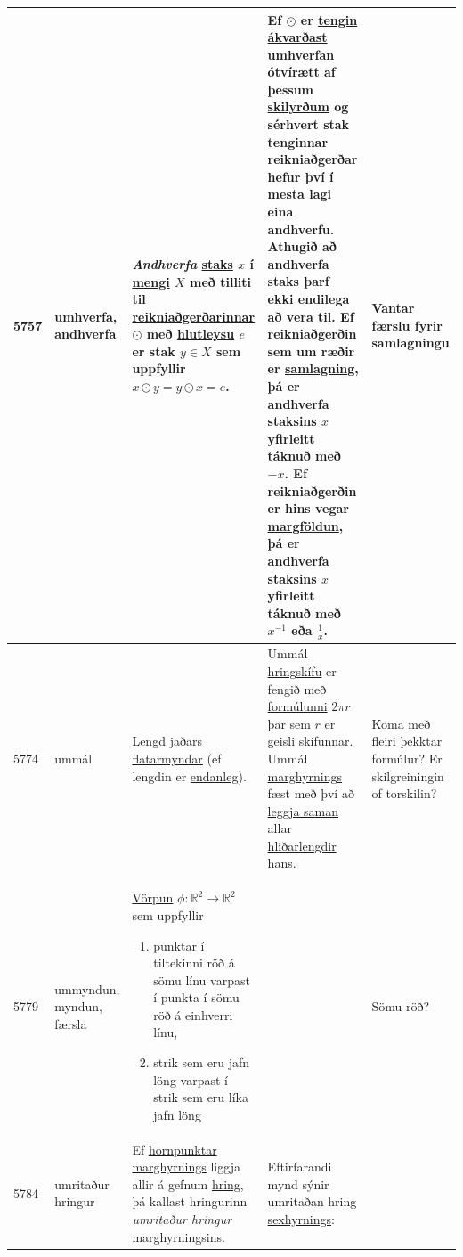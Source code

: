 \begin{longtable}{p{} | p{} | p{} | p{} | p{}}
\hline
5757 & \hypertarget{row:5757}{umhverfa, andhverfa} & \textit{Andhverfa} \hyperlink{row:5128}{staks} \(x\) í \hyperlink{row:3270}{mengi} \(X\) með tilliti til \hyperlink{row:46}{reikniaðgerðarinnar} \(\odot\) með \hyperlink{row:0}{hlutleysu} \(e\) er stak \(y \in X\) sem uppfyllir \(x \odot y = y \odot x = e\). & Ef \(\odot\) er \hyperlink{row:5473}{tengin} \hyperlink{row:3932}{ákvarðast umhverfan ótvírætt} af þessum \hyperlink{row:4797}{skilyrðum} og sérhvert stak tenginnar reikniaðgerðar hefur því í mesta lagi eina andhverfu. Athugið að andhverfa staks þarf ekki endilega að vera til. Ef reikniaðgerðin sem um ræðir er \hyperlink{row:0}{samlagning}, þá er andhverfa staksins \(x\) yfirleitt táknuð með \(-x\). Ef reikniaðgerðin er hins vegar \hyperlink{row:3141}{margföldun}, þá er andhverfa staksins \(x\) yfirleitt táknuð með \(x^{-1}\) eða \(\frac1x\). & Vantar færslu fyrir samlagningu \\
\hline
5774 & \hypertarget{row:5774}{ummál} & \hyperlink{row:2860}{Lengd} \hyperlink{row:2453}{jaðars} \hyperlink{row:4891}{flatarmyndar} (ef lengdin er \hyperlink{row:1009}{endanleg}). & Ummál \hyperlink{row:6589}{hringskífu} er fengið með \hyperlink{row:1363}{formúlunni} \(2\pi r\) þar sem \(r\) er geisli skífunnar. Ummál \hyperlink{row:3161}{marghyrnings} fæst með því að \hyperlink{row:2820}{leggja saman} allar \hyperlink{row:0}{hliðarlengdir} hans. & Koma með fleiri þekktar formúlur? Er skilgreiningin of torskilin? \\
\hline
5779 & \hypertarget{row:5779}{ummyndun, myndun, færsla} & \hyperlink{row:3282}{Vörpun} \(\phi : \mathbb{R}^2 \to \mathbb{R}^2\) sem uppfyllir

\begin{enumerate}
    \item punktar í tiltekinni röð á sömu línu varpast í punkta í sömu röð á einhverri línu,
    \item strik sem eru jafn löng varpast í strik sem eru líka jafn löng
\end{enumerate} &  & Sömu röð? \\
\hline
5784 & \hypertarget{row:5784}{umritaður hringur} & Ef \hyperlink{row:2235}{hornpunktar} \hyperlink{row:3161}{marghyrnings} liggja allir á gefnum \hyperlink{row:2295}{hring}, þá kallast hringurinn \textit{umritaður hringur} marghyrningsins. & Eftirfarandi mynd sýnir umritaðan hring \hyperlink{row:4628}{sexhyrnings}:


\end{longtable}
